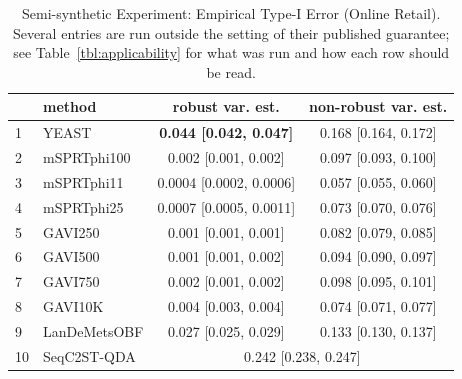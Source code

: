 \begin{table}[ht]
    \caption{Semi-synthetic Experiment: Empirical Type-I Error (Online Retail). Several entries are run outside the setting of their published guarantee; see Table~\ref{tbl:applicability} for what was run and how each row should be read.}\label{tbl:real-world-experiment-online-retail}
    \centering
    \begin{small}
    \setlength{\tabcolsep}{4pt}
\begin{tabular}{llcc}
  \hline
 & method & robust var. est. & non-robust var. est.\\
  \hline
  1 & YEAST & \textbf{0.044 [0.042, 0.047]} & 0.168 [0.164, 0.172] \\
  2 & mSPRTphi100 & 0.002 [0.001, 0.002] & 0.097 [0.093, 0.100] \\
  3 & mSPRTphi11 & 0.0004 [0.0002, 0.0006] & 0.057 [0.055, 0.060] \\
  4 & mSPRTphi25 & 0.0007 [0.0005, 0.0011] & 0.073 [0.070, 0.076] \\
  5 & GAVI250 & 0.001 [0.001, 0.001] & 0.082 [0.079, 0.085] \\
  6 & GAVI500 & 0.001 [0.001, 0.002] & 0.094 [0.090, 0.097] \\
  7 & GAVI750 & 0.002 [0.001, 0.002] & 0.098 [0.095, 0.101] \\
  8 & GAVI10K & 0.004 [0.003, 0.004] & 0.074 [0.071, 0.077] \\
  9 & LanDeMetsOBF & 0.027 [0.025, 0.029] & 0.133 [0.130, 0.137] \\
  10 & SeqC2ST-QDA & \multicolumn{2}{c}{0.242 [0.238, 0.247]} \\
   \hline
\end{tabular}
\end{small}
\end{table}
